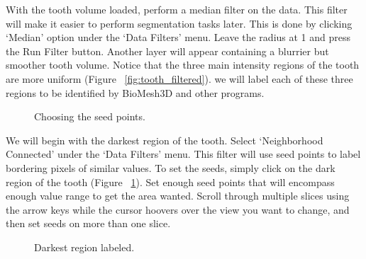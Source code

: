 \documentclass[fleqn,12pt,openany]{book}
\begin{document}
With the tooth volume loaded, perform a median filter on the data.  This filter 
will make it easier to perform segmentation tasks later.  This is done by 
clicking  `Median'  option under the `Data Filters' menu.  Leave the radius 
at 1 and press the Run Filter button.  Another layer will appear containing a 
blurrier but smoother tooth volume. Notice that the three main intensity 
regions of the tooth are more uniform (Figure ~\ref{fig:tooth_filtered}).  
we will label each of these three regions to be identified by BioMesh3D 
and other programs.

\begin{figure}
\caption{\label{fig:tooth_seeds} Choosing the seed points.}
\end{figure} 

We will begin with the darkest region of the tooth.  Select 
`Neighborhood Connected' under the `Data Filters' menu.  This filter will 
use seed points to label bordering pixels of similar values.  To set the 
seeds, simply click on the dark region of the tooth 
(Figure ~\ref{fig:tooth_seeds}).  Set enough seed points that will encompass 
enough value range to get the area wanted.  Scroll through multiple slices using
the arrow keys while the cursor hoovers over the view you want to change, and then 
 set seeds on more than one slice.

\begin{figure}
\caption{\label{fig:tooth_firstone} Darkest region labeled.}
\end{figure}
\end{document}
